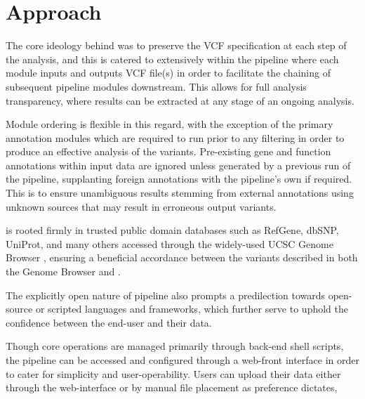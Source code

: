 
\vspace{-1cm}
\section{Approach}

The core ideology behind \app was to preserve the VCF specification at each step of the analysis, and this is catered to extensively within the pipeline where each module inputs and outputs VCF file(s) in order to facilitate the chaining of subsequent pipeline modules downstream. This allows for full analysis transparency, where results can be extracted at any stage of an ongoing analysis. 

Module ordering is flexible in this regard, with the exception of the primary annotation modules which are required to run prior to any filtering in order to produce an effective analysis of the variants. Pre-existing gene and function annotations within input data are ignored unless generated by a previous run of the \app pipeline, supplanting foreign annotations with the pipeline's own if required. This is to ensure unambiguous results stemming from external annotations using unknown sources that may result in erroneous output variants.

\app is rooted firmly in trusted public domain databases such as RefGene, dbSNP, UniProt, and many others accessed through the widely-used UCSC Genome Browser \citep{karolchik2003ucsc}, ensuring a beneficial accordance between the variants described in both the Genome Browser and \app.

The explicitly open nature of pipeline also prompts a predilection towards open-source or scripted languages and frameworks, which further serve to uphold the confidence between the end-user and their data.

Though core operations are managed primarily through back-end shell scripts, the pipeline can be accessed and configured through a web-front interface in order to cater for simplicity and user-operability. Users can upload their data either through the web-interface or by manual file placement as preference dictates,
